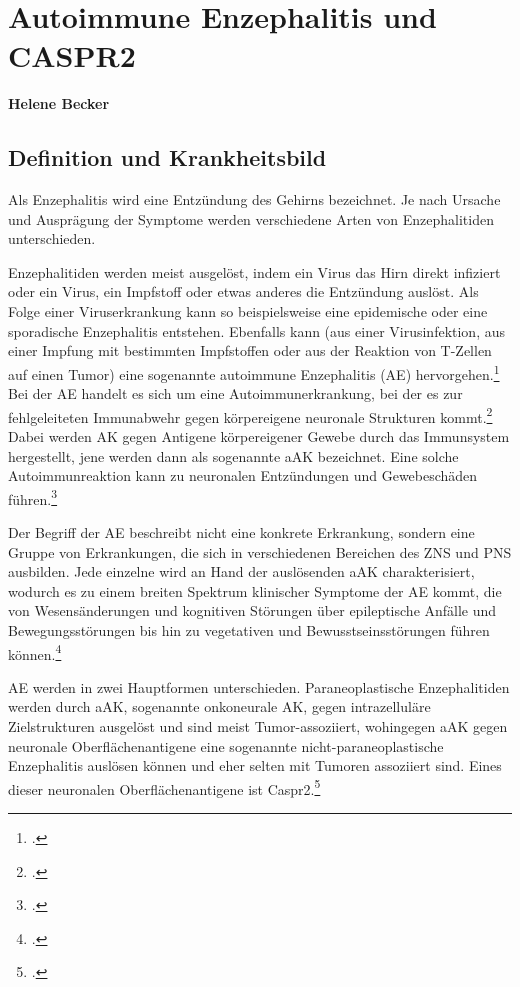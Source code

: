 \documentclass[a4paper, 12pt]{scrreprt}
\begin{document}
\chapter{Autoimmune Enzephalitis und CASPR2}
\textbf{Helene Becker}
    \section{Definition und Krankheitsbild}
    Als Enzephalitis wird eine Entzündung des Gehirns bezeichnet.
    Je nach Ursache und Ausprägung der Symptome werden verschiedene Arten
    von Enzephalitiden unterschieden.
    
    Enzephalitiden werden meist ausgelöst, indem ein Virus das Hirn direkt
    infiziert oder ein Virus, ein Impfstoff oder etwas anderes die Entzündung
    auslöst. Als Folge einer Viruserkrankung kann so beispielsweise eine
    epidemische oder eine sporadische Enzephalitis entstehen. Ebenfalls kann
    (aus einer Virusinfektion, aus einer Impfung mit bestimmten Impfstoffen
    oder aus der Reaktion von T-Zellen auf einen Tumor) eine sogenannte
    autoimmune Enzephalitis (AE) hervorgehen.\footcite{Klein2026}
    Bei der AE handelt es sich um eine Autoimmunerkrankung, bei der es zur
    fehlgeleiteten Immunabwehr gegen körpereigene neuronale Strukturen
    kommt.\footcites{Klein2026}{Fernandez2026}
    Dabei werden AK gegen Antigene körpereigener Gewebe durch das
    Immunsystem hergestellt, jene werden dann als sogenannte aAK
    bezeichnet. Eine solche Autoimmunreaktion kann zu neuronalen
    Entzündungen und Gewebeschäden führen.\footcite{Fernandez2026}
    
    Der Begriff der AE beschreibt nicht eine konkrete Erkrankung, sondern
    eine Gruppe von Erkrankungen, die sich in verschiedenen Bereichen des
    ZNS und PNS ausbilden. Jede
    einzelne wird an Hand der auslösenden aAK charakterisiert, wodurch es zu
    einem breiten Spektrum klinischer Symptome der AE kommt, die von
    Wesensänderungen und kognitiven Störungen über epileptische Anfälle und
    Bewegungsstörungen bis hin zu vegetativen und Bewusstseinsstörungen
    führen können.\footcite[S.~525]{Heine2022}
    
    AE werden in zwei Hauptformen unterschieden. Paraneoplastische
    Enzephalitiden werden durch aAK, sogenannte onkoneurale AK, gegen
    intrazelluläre Zielstrukturen ausgelöst und sind meist Tumor-assoziiert,
    wohingegen aAK gegen neuronale Oberflächenantigene eine sogenannte
    nicht-paraneoplastische Enzephalitis auslösen können und eher selten mit
    Tumoren assoziiert sind. Eines dieser neuronalen Oberflächenantigene ist
    Caspr2.\footcite[S.~526--528]{Heine2022}
    
\end{document}
